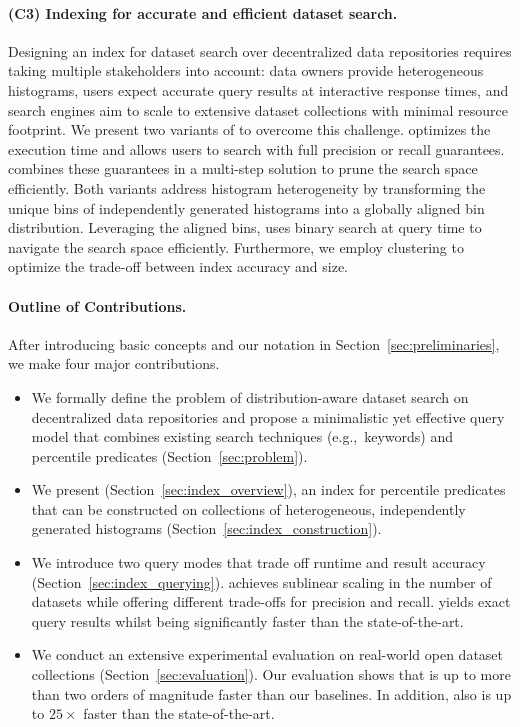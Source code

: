 \paragraph{(C3) Indexing for accurate and efficient dataset search.}
Designing an index for dataset search over decentralized data repositories requires taking multiple stakeholders into account: data owners provide heterogeneous histograms, users expect accurate query results at interactive response times, and search engines aim to scale to extensive dataset collections with minimal resource footprint.
We present two variants of \system{} to overcome this challenge.
\approximate{} optimizes the execution time and allows users to search with full precision or recall guarantees.
\exact{} combines these guarantees in a multi-step solution to prune the search space efficiently.
Both \system{} variants address histogram heterogeneity by transforming the unique bins of independently generated histograms into a globally aligned bin distribution.
Leveraging the aligned bins, \system{} uses binary search at query time to navigate the search space efficiently.
Furthermore, we employ clustering to optimize the trade-off between index accuracy and size.

\paragraph{Outline of Contributions.}
After introducing basic concepts and our notation in Section~\ref{sec:preliminaries}, we make four major contributions.

\begin{itemize}[left=0pt]
    \item
    We formally define the problem of distribution-aware dataset search on decentralized data repositories and propose a minimalistic yet effective query model that combines existing search techniques (e.g.,~keywords) and percentile predicates (Section~\ref{sec:problem}).

    \item
    We present \system{} (Section~\ref{sec:index_overview}), an index for percentile predicates that can be constructed on collections of heterogeneous, independently generated histograms (Section~\ref{sec:index_construction}).

    \item
    We introduce two query modes that trade off runtime and result accuracy (Section~\ref{sec:index_querying}).
    \approximate{} achieves sublinear scaling in the number of datasets while offering different trade-offs for precision and recall.
    \exact{} yields exact query results whilst being significantly faster than the state-of-the-art.

    \item
    We conduct an extensive experimental evaluation on real-world open dataset collections (Section~\ref{sec:evaluation}).
    Our evaluation shows that \approximate{} is up to more than two orders of magnitude faster than our baselines.
    In addition, \exact{} also is up to $25\times$ faster than the state-of-the-art.
\end{itemize}

